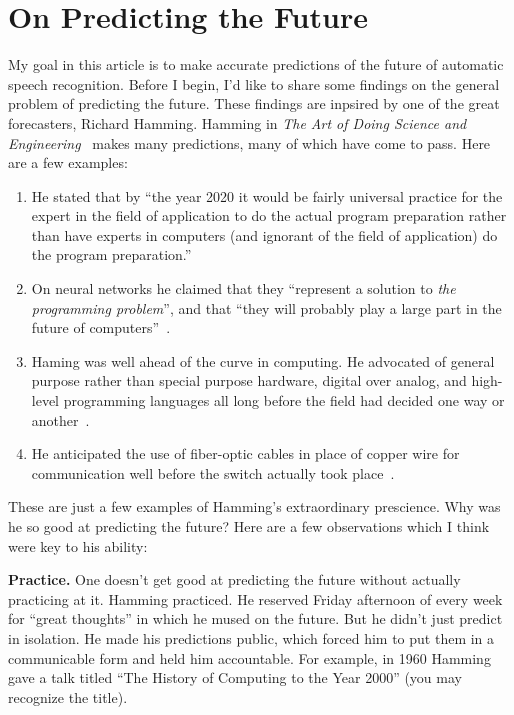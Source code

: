 \section{On Predicting the Future}
\label{sec:predicting_future}

My goal in this article is to make accurate predictions of the future of
automatic speech recognition. Before I begin, I'd like to share some
findings on the general problem of predicting the future. These findings are
inpsired by one of the great forecasters, Richard Hamming. Hamming in \emph{The
Art of Doing Science and Engineering}~\citep{hamming1997art} makes many
predictions, many of which have come to pass. Here are a few examples:
\begin{enumerate}
    \item He stated that by ``the year 2020 it would be fairly universal
        practice for the expert in the field of application to do the actual
        program preparation rather than have experts in computers (and ignorant
        of the field of application) do the program preparation.''
    \item On neural networks he claimed that they ``represent a solution to
        \emph{the programming problem}'', and that ``they will probably play a
        large part in the future of computers''~\citep[chp. 4]{hamming1997art}.
    \item Haming was well ahead of the curve in computing. He advocated of
        general purpose rather than special purpose hardware, digital over
        analog, and high-level programming languages all long before the field
        had decided one way or another~\citep[chps. 2 and 4]{hamming1997art}.
    \item He anticipated the use of fiber-optic cables in place of copper wire
        for communication well before the switch actually took
        place~\citep[chp. 21]{hamming1997art}.
\end{enumerate}

These are just a few examples of Hamming's extraordinary prescience. Why was he
so good at predicting the future? Here are a few observations which I think were key to his ability:

{\bf Practice.} One doesn't get good at predicting the future without actually
practicing at it. Hamming practiced. He reserved Friday afternoon of every week
for ``great thoughts'' in which he mused on the future. But he didn't just
predict in isolation. He made his predictions public, which forced him to put
them in a communicable form and held him accountable. For example, in 1960
Hamming gave a talk titled ``The History of Computing to the Year 2000'' (you
may recognize the title).

